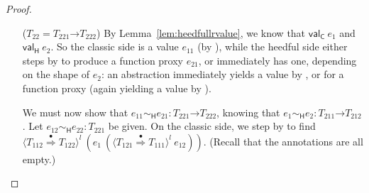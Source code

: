 \documentclass[9pt]{extarticle}
\newcommand{\ottnt}[1]{\mathit{#1}}
\newcommand{\ottsym}[1]{#1}
\begin{document}
{\begin{lemma}
\begin{proof}
{\begin{itemize}
      If $ \ottnt{e_{{\mathrm{12}}}}  [  \ottnt{k} / \mathit{x}  ]  \,  \longrightarrow ^{*}_{  \mathsf{C}  }  \,  \mathord{\Uparrow}  \ottnt{l'} $, then $ \ottnt{e_{{\mathrm{22}}}}  [  \ottnt{k} / \mathit{x}  ]  \,  \longrightarrow ^{*}_{  \mathsf{H}  }  \,  \mathord{\Uparrow}  \ottnt{l''} $, and both terms reduce to blame by 
      and ---this completes the proof.
If not, then both predicates reduce to a boolean together. If
      they reduce to $ \mathsf{false} $, then both terms eventually
      reduces to $ \mathord{\Uparrow}  \ottnt{l} $ via  and ,
      and we are done.
If they both go to $ \mathsf{true} $, then both sides step by
       and  to yield $\ottnt{k}$, and we can find
      $ \ottnt{k}   \sim _{  \mathsf{H}  }  \ottnt{k}  :   \{ \mathit{x} \mathord{:} \ottnt{B} \mathrel{\mid} \ottnt{e_{{\mathrm{22}}}} \}  $ easily---we have a derivation for
      $ \ottnt{e_{{\mathrm{22}}}}  [  \ottnt{k} / \mathit{x}  ]  \,  \longrightarrow ^{*}_{  \mathsf{H}  }  \,  \mathsf{true} $ handy.

    \item[($\ottnt{T_{{\mathrm{22}}}}  \ottsym{=}   \ottnt{T_{{\mathrm{221}}}} \mathord{ \rightarrow } \ottnt{T_{{\mathrm{222}}}} $)] By Lemma~\ref{lem:heedfullrvalue},
      we know that $ \mathsf{val} _{  \mathsf{C}  }~ \ottnt{e_{{\mathrm{1}}}} $ and $ \mathsf{val} _{  \mathsf{H}  }~ \ottnt{e_{{\mathrm{2}}}} $. So the classic
      side is a value $\ottnt{e_{{\mathrm{11}}}}$ (by ), while the heedful
      side either steps by  to produce a function proxy
      $\ottnt{e_{{\mathrm{21}}}}$, or immediately has one, depending on the shape of
      $\ottnt{e_{{\mathrm{2}}}}$: an abstraction immediately yields a value by
      , or  for a function proxy (again
      yielding a value by ).

      We must now show that $ \ottnt{e_{{\mathrm{11}}}}   \sim _{  \mathsf{H}  }  \ottnt{e_{{\mathrm{21}}}}  :   \ottnt{T_{{\mathrm{221}}}} \mathord{ \rightarrow } \ottnt{T_{{\mathrm{222}}}}  $, knowing
      that $ \ottnt{e_{{\mathrm{1}}}}   \sim _{  \mathsf{H}  }  \ottnt{e_{{\mathrm{2}}}}  :   \ottnt{T_{{\mathrm{211}}}} \mathord{ \rightarrow } \ottnt{T_{{\mathrm{212}}}}  $. Let $ \ottnt{e_{{\mathrm{12}}}}   \sim _{  \mathsf{H}  }  \ottnt{e_{{\mathrm{22}}}}  :  \ottnt{T_{{\mathrm{221}}}} $ be
      given. On the classic side, we step by  to find
      $ \langle  \ottnt{T_{{\mathrm{112}}}}  \mathord{ \overset{\bullet}{\Rightarrow} }  \ottnt{T_{{\mathrm{122}}}}  \rangle^{ \ottnt{l} } ~   (  \ottnt{e_{{\mathrm{1}}}} ~  (  \langle  \ottnt{T_{{\mathrm{121}}}}  \mathord{ \overset{\bullet}{\Rightarrow} }  \ottnt{T_{{\mathrm{111}}}}  \rangle^{ \ottnt{l} } ~  \ottnt{e_{{\mathrm{12}}}}  )   )  $. (Recall that the
      annotations are all empty.)


\end{itemize}}
\end{proof}
\end{lemma}}
\end{document}
